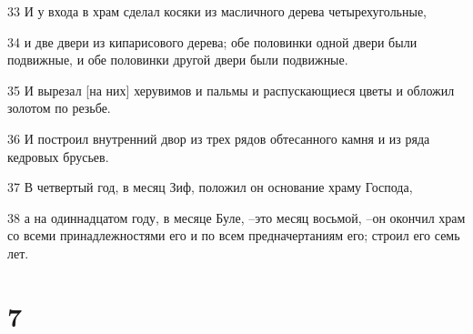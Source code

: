 \par 33 И у входа в храм сделал косяки из масличного дерева четырехугольные,
\par 34 и две двери из кипарисового дерева; обе половинки одной двери были подвижные, и обе половинки другой двери были подвижные.
\par 35 И вырезал [на них] херувимов и пальмы и распускающиеся цветы и обложил золотом по резьбе.
\par 36 И построил внутренний двор из трех рядов обтесанного камня и из ряда кедровых брусьев.
\par 37 В четвертый год, в месяц Зиф, положил он основание храму Господа,
\par 38 а на одиннадцатом году, в месяце Буле, --это месяц восьмой, --он окончил храм со всеми принадлежностями его и по всем предначертаниям его; строил его семь лет.

\chapter{7}

